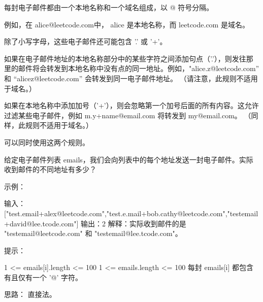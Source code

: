 每封电子邮件都由一个本地名称和一个域名组成，以 @ 符号分隔。

例如，在 alice@leetcode.com中， alice 是本地名称，而 leetcode.com 是域名。

除了小写字母，这些电子邮件还可能包含 '.' 或 '+'。

如果在电子邮件地址的本地名称部分中的某些字符之间添加句点（'.'），则发往那里的邮件将会转发到本地名称中没有点的同一地址。例如，"alice.z@leetcode.com” 和 “alicez@leetcode.com” 会转发到同一电子邮件地址。 （请注意，此规则不适用于域名。）

如果在本地名称中添加加号（'+'），则会忽略第一个加号后面的所有内容。这允许过滤某些电子邮件，例如 m.y+name@email.com 将转发到 my@email.com。 （同样，此规则不适用于域名。）

可以同时使用这两个规则。

给定电子邮件列表 emails，我们会向列表中的每个地址发送一封电子邮件。实际收到邮件的不同地址有多少？

 

示例：

输入：["test.email+alex@leetcode.com","test.e.mail+bob.cathy@leetcode.com","testemail+david@lee.tcode.com"]
输出：2
解释：实际收到邮件的是 "testemail@leetcode.com" 和 "testemail@lee.tcode.com"。

 

提示：

    1 <= emails[i].length <= 100
    1 <= emails.length <= 100
    每封 emails[i] 都包含有且仅有一个 '@' 字符。






















思路：
直接法。
























